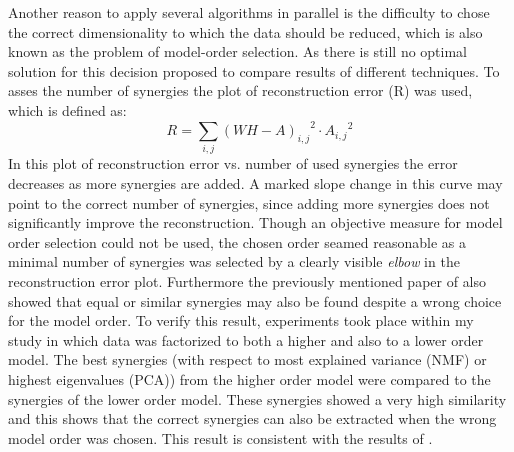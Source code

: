 Another reason to apply several algorithms in parallel is the difficulty to chose the correct dimensionality to which the data should be reduced, which is also known as the problem of model-order selection. As there is still no optimal solution for this decision \citeauthor{Tresch:2006p3766} proposed to compare results of different techniques. To asses the number of synergies the plot of reconstruction error (R) was used, which is defined as:
\begin{equation}
    R = \sum_{i,j}{{(W H - A)_{i,j}}^2 \cdot {A_{i,j}}^2}
\end{equation}
In this plot of reconstruction error vs. number of used synergies the error decreases as more synergies are added. A marked slope change in this curve may point to the correct number of synergies, since adding more synergies does not significantly improve the reconstruction. Though an objective measure for model order selection could not be used, the chosen order seamed reasonable as a minimal number of synergies was selected by a clearly visible \emph{elbow} in the reconstruction error plot. Furthermore the previously mentioned paper of \citeauthor{Tresch:2006p3766} also showed that equal or similar synergies may also be found despite a wrong choice for the model order. To verify this result, experiments took place within my study in which data was factorized to both a higher and also to a lower order model. The best synergies (with respect to most explained variance (NMF) or highest eigenvalues (PCA)) from the higher order model were compared to the synergies of the lower order model. These synergies showed a very high similarity and this shows that the correct synergies can also be extracted when the wrong model order was chosen. This result is consistent with the results of \citeauthor{Tresch:2006p3766}.



